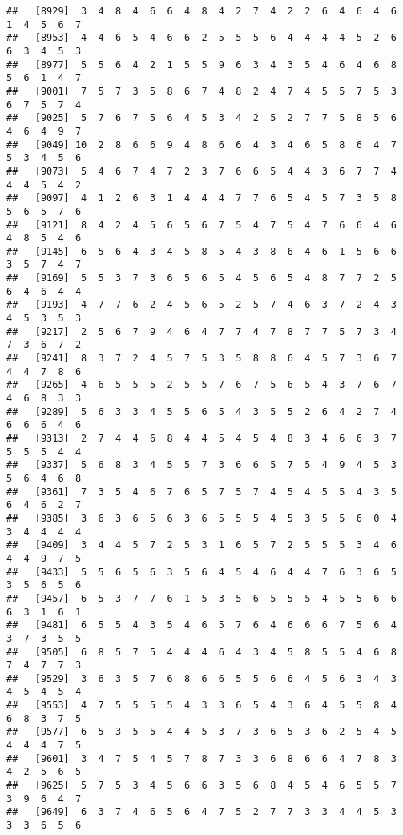 \documentclass[
]{book}
\begin{document}
\begin{verbatim}
##   [8929]  3  4  8  4  6  6  4  8  4  2  7  4  2  2  6  4  6  4  6  1  4  5  6  7
##   [8953]  4  4  6  5  4  6  6  2  5  5  5  6  4  4  4  4  5  2  6  6  3  4  5  3
##   [8977]  5  5  6  4  2  1  5  5  9  6  3  4  3  5  4  6  4  6  8  5  6  1  4  7
##   [9001]  7  5  7  3  5  8  6  7  4  8  2  4  7  4  5  5  7  5  3  6  7  5  7  4
##   [9025]  5  7  6  7  5  6  4  5  3  4  2  5  2  7  7  5  8  5  6  4  6  4  9  7
##   [9049] 10  2  8  6  6  9  4  8  6  6  4  3  4  6  5  8  6  4  7  5  3  4  5  6
##   [9073]  5  4  6  7  4  7  2  3  7  6  6  5  4  4  3  6  7  7  4  4  4  5  4  2
##   [9097]  4  1  2  6  3  1  4  4  4  7  7  6  5  4  5  7  3  5  8  5  6  5  7  6
##   [9121]  8  4  2  4  5  6  5  6  7  5  4  7  5  4  7  6  6  4  6  4  8  5  4  6
##   [9145]  6  5  6  4  3  4  5  8  5  4  3  8  6  4  6  1  5  6  6  3  5  7  4  7
##   [9169]  5  5  3  7  3  6  5  6  5  4  5  6  5  4  8  7  7  2  5  6  4  6  4  4
##   [9193]  4  7  7  6  2  4  5  6  5  2  5  7  4  6  3  7  2  4  3  4  5  3  5  3
##   [9217]  2  5  6  7  9  4  6  4  7  7  4  7  8  7  7  5  7  3  4  7  3  6  7  2
##   [9241]  8  3  7  2  4  5  7  5  3  5  8  8  6  4  5  7  3  6  7  4  4  7  8  6
##   [9265]  4  6  5  5  5  2  5  5  7  6  7  5  6  5  4  3  7  6  7  4  6  8  3  3
##   [9289]  5  6  3  3  4  5  5  6  5  4  3  5  5  2  6  4  2  7  4  6  6  6  4  6
##   [9313]  2  7  4  4  6  8  4  4  5  4  5  4  8  3  4  6  6  3  7  5  5  5  4  4
##   [9337]  5  6  8  3  4  5  5  7  3  6  6  5  7  5  4  9  4  5  3  5  6  4  6  8
##   [9361]  7  3  5  4  6  7  6  5  7  5  7  4  5  4  5  5  4  3  5  6  4  6  2  7
##   [9385]  3  6  3  6  5  6  3  6  5  5  5  4  5  3  5  5  6  0  4  3  4  4  4  4
##   [9409]  3  4  4  5  7  2  5  3  1  6  5  7  2  5  5  5  3  4  6  4  4  9  7  5
##   [9433]  5  5  6  5  6  3  5  6  4  5  4  6  4  4  7  6  3  6  5  3  5  6  5  6
##   [9457]  6  5  3  7  7  6  1  5  3  5  6  5  5  5  4  5  5  6  6  6  3  1  6  1
##   [9481]  6  5  5  4  3  5  4  6  5  7  6  4  6  6  6  7  5  6  4  3  7  3  5  5
##   [9505]  6  8  5  7  5  4  4  4  6  4  3  4  5  8  5  5  4  6  8  7  4  7  7  3
##   [9529]  3  6  3  5  7  6  8  6  6  5  5  6  6  4  5  6  3  4  3  4  5  4  5  4
##   [9553]  4  7  5  5  5  5  4  3  3  6  5  4  3  6  4  5  5  8  4  6  8  3  7  5
##   [9577]  6  5  3  5  5  4  4  5  3  7  3  6  5  3  6  2  5  4  5  4  4  4  7  5
##   [9601]  3  4  7  5  4  5  7  8  7  3  3  6  8  6  6  4  7  8  3  4  2  5  6  5
##   [9625]  5  7  5  3  4  5  6  6  3  5  6  8  4  5  4  6  5  5  7  3  9  6  4  7
##   [9649]  6  3  7  4  6  5  6  4  7  5  2  7  7  3  3  4  4  5  3  3  3  6  5  6

\end{verbatim}
\end{document}
